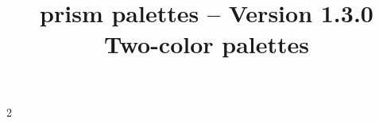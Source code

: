 \documentclass[theme = dark]{tutodoc}
\title{\raisebox{-.20ex}{@}prism palettes -- Version 1.3.0\\ Two-color palettes}
\date{}
\begin{document}
\maketitle{}

{
  \setlength{\columnsep}{2cm}
  \setlength{\columnseprule}{0.4pt}

  \begin{multicols}{2}
    \tableofcontents
  \end{multicols}
}

\newpage


















\end{document}

